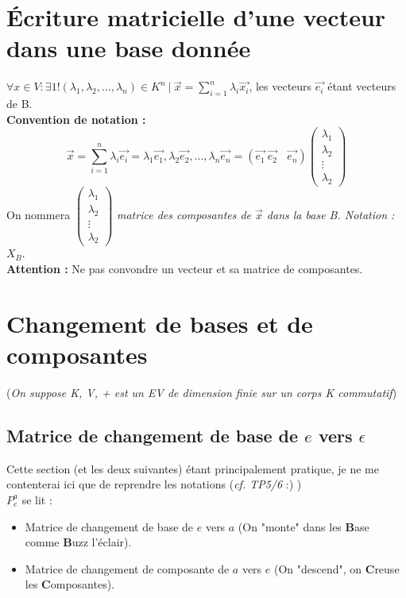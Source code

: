 \documentclass[11pt, a4paper, openany]{book}
\begin{document}
	\section{Écriture matricielle d'une vecteur dans une base donnée}
	$\forall x \in V : \exists 1!(\lambda_{1}, \lambda_{2}, ..., \lambda_{n}) \in K^{n}\ |\ \vec{x} = \sum_{i=1}^{n} \lambda_{i}\vec{x_{i}}$, les vecteurs $\vec{e_{i}}$ étant vecteurs de B.\\
	\textbf{Convention de notation :}\\
	$$\vec{x} = \sum_{i=1}^{n}  \lambda_{i}\vec{e_{i}} = \lambda_{1}\vec{e_{1}}, \lambda_{2}\vec{e_{2}}, ..., \lambda_{n}\vec{e_{n}} = (\vec{e_{1}}\ \vec{e_{2}}\ \ \ \ \vec{e_{n}})\begin{pmatrix} 
	\lambda_1 \\ 
	\lambda_2 \\ 
	\vdots\\ 
	\lambda_2 \end{pmatrix}$$
	On nommera $\begin{pmatrix} 
	\lambda_1 \\ 
	\lambda_2 \\ 
	\vdots\\ 
	\lambda_2 \end{pmatrix}$ \textit{matrice des composantes de $\vec{x}$ dans la base B. Notation : $X_B$}.
	\\
	\textbf{Attention :} Ne pas convondre un vecteur et sa matrice de 
	composantes.
	
	
	\section{Changement de bases et de composantes}
	(\textit{On suppose K, V, + est un EV de dimension finie sur un corps K commutatif})\\
	\subsection{Matrice de changement de base de $e$ vers $\epsilon$}
	Cette section (et les deux suivantes) étant principalement pratique, je ne me contenterai ici que de reprendre les notations (\textit{cf. TP5/6} :) )\\
	$P_e^a$ se lit :
	\begin{itemize}
		\item Matrice de changement de base de $e$ vers $a$ (On "monte" dans les \textbf{B}ase comme \textbf{B}uzz l'éclair).
		\item Matrice de changement de composante de $a$ vers $e$ (On "descend", on \textbf{C}reuse les \textbf{C}omposantes).
	\end{itemize}
\end{document}
